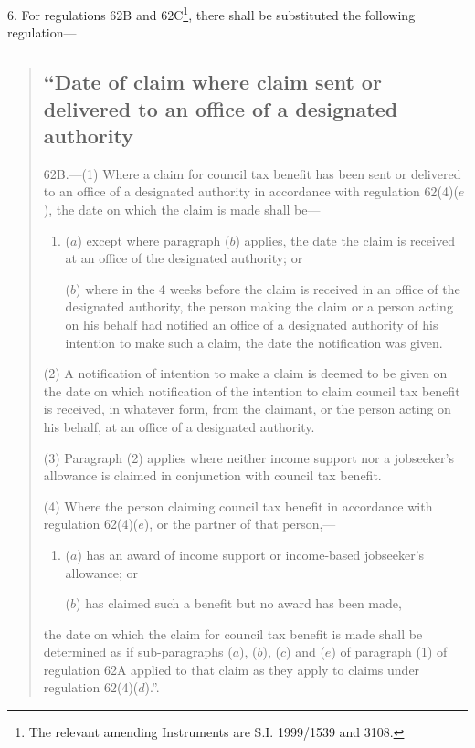 \documentclass[12pt,a4paper]{article}
\begin{document}
6.  For regulations 62B and 62C\footnote{\frenchspacing The relevant amending Instruments are S.I. 1999/1539 and 3108.}, there shall be substituted the following regulation—
\begin{quotation}
\subsection*{“Date of claim where claim sent or delivered to an office of a designated authority}

62B.---(1)  Where a claim for council tax benefit has been sent or delivered to an office of a designated authority in accordance with regulation 62(4)($e$), the date on which the claim is made shall be—
\begin{enumerate}\item[]
($a$) except where paragraph ($b$)  applies, the date the claim is received at an office of the designated authority; or

($b$) where in the 4 weeks before the claim is received in an office of the designated authority, the person making the claim or a person acting on his behalf had notified an office of a designated authority of his intention to make such a claim, the date the notification was given.
\end{enumerate}

(2) A notification of intention to make a claim is deemed to be given on the date on which notification of the intention to claim council tax benefit is received, in whatever form, from the claimant, or the person acting on his behalf, at an office of a designated authority.

(3) Paragraph (2) applies where neither income support nor a jobseeker’s allowance is claimed in conjunction with council tax benefit.

(4) Where the person claiming council tax benefit in accordance with regulation 62(4)($e$), or the partner of that person,—
\begin{enumerate}\item[]
($a$) has an award of income support or income-based jobseeker’s allowance; or

($b$) has claimed such a benefit but no award has been made,
\end{enumerate}
the date on which the claim for council tax benefit is made shall be determined as if sub-paragraphs ($a$), ($b$), ($c$)  and ($e$)  of paragraph (1) of regulation 62A applied to that claim as they apply to claims under regulation 62(4)($d$).”.
\end{quotation}
\end{document}

